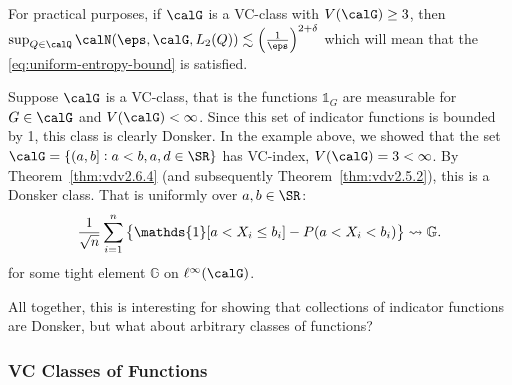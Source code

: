 \begin{remark*}
	For practical purposes, if \(\calG\) is a VC-class with \(V(\calG) \geq 3\), then \(\sup_{Q\in\calQ}\calN(\eps,\calG,L_2(Q)) \lesssim \left(\frac{1}{\eps}\right)^{2+ \delta}\) which will mean that the \eqref{eq:uniform-entropy-bound} is satisfied. 
\end{remark*}

\begin{example*}
	Suppose \(\calG\) is a VC-class, that is the functions \(\mathds{1}_G\) are measurable for \(G \in \calG\) and \(V(\calG) <\infty\). Since this set of indicator functions is bounded by 1, this class is clearly Donsker. In the example above, we showed that the set \(\calG = \{(a,b]: a< b, a,d \in \SR\}\) has VC-index, \(V(\calG) = 3 < \infty\). By Theorem~\ref{thm:vdv2.6.4} (and subsequently Theorem~\ref{thm:vdv2.5.2}), this is a Donsker class. That is uniformly over \(a,b\in\SR\):
	\[
		\frac{1}{\sqrt{n}}\sum_{i=1}^n \left\{\mathds{1}[a < X_i \leq b_i] - P(a < X_i < b_i)\right\} \wcov \mathbb{G}
	.\] 
	for some tight element \(\mathbb{G}\) on \(\ell^\infty(\calG)\).
\end{example*}

All together, this is interesting for showing that collections of indicator functions are Donsker, but what about arbitrary classes of functions?

\subsubsection{VC Classes of Functions}

